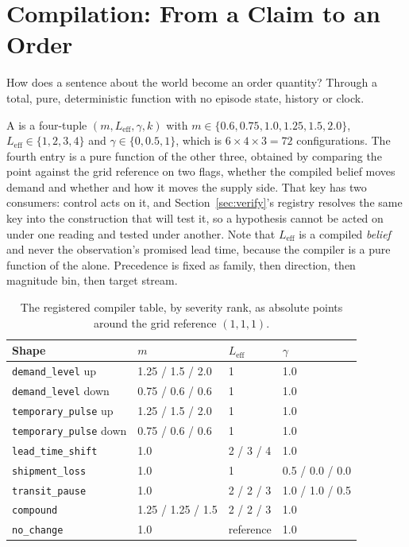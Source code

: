 \section{Compilation: From a Claim to an Order}
\label{sec:compile}

How does a sentence about the world become an order quantity? Through a total,
pure, deterministic function with no episode state, history or clock.

A \controlconfig{} is a four-tuple $(m, L_{\mathrm{eff}}, \gamma, k)$ with
$m \in \{0.6, 0.75, 1.0, 1.25, 1.5, 2.0\}$, $L_{\mathrm{eff}} \in \{1,2,3,4\}$
and $\gamma \in \{0, 0.5, 1\}$, which is $6 \times 4 \times 3 = 72$
configurations. The fourth entry is a pure function of the other three, obtained
by comparing the point against the grid reference on two flags, whether the
compiled belief moves demand and whether and how it moves the supply side. That
key has two consumers: control acts on it, and Section~\ref{sec:verify}'s
registry resolves the same key into the construction that will test it, so a
hypothesis cannot be acted on under one reading and tested under another. Note
that $L_{\mathrm{eff}}$ is a compiled \emph{belief} and never the observation's
promised lead time, because the compiler is a pure function of the \shockspec{}
alone. Precedence is fixed as family, then direction, then magnitude bin, then
target stream.

\begin{table}[!tb]
\caption{The registered compiler table, by severity rank, as absolute points
around the grid reference $(1, 1, 1)$.}
\label{tab:mapping}
\centering
\footnotesize
\begin{tabular}{@{}llll@{}}
\toprule
Shape & $m$ & $L_{\mathrm{eff}}$ & $\gamma$ \\
\midrule
\texttt{demand\_level} up      & 1.25 / 1.5 / 2.0 & 1 & 1.0 \\
\texttt{demand\_level} down    & 0.75 / 0.6 / 0.6 & 1 & 1.0 \\
\texttt{temporary\_pulse} up   & 1.25 / 1.5 / 2.0 & 1 & 1.0 \\
\texttt{temporary\_pulse} down & 0.75 / 0.6 / 0.6 & 1 & 1.0 \\
\texttt{lead\_time\_shift}     & 1.0 & 2 / 3 / 4 & 1.0 \\
\texttt{shipment\_loss}        & 1.0 & 1 & 0.5 / 0.0 / 0.0 \\
\texttt{transit\_pause}        & 1.0 & 2 / 2 / 3 & 1.0 / 1.0 / 0.5 \\
\texttt{compound}              & 1.25 / 1.25 / 1.5 & 2 / 2 / 3 & 1.0 \\
\texttt{no\_change}            & 1.0 & reference & 1.0 \\
\bottomrule
\end{tabular}
\end{table}

